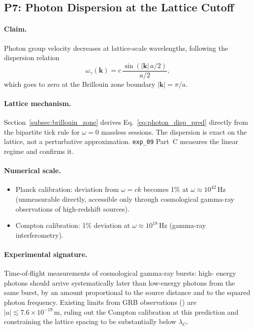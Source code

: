 \subsection{P7: Photon Dispersion at the Lattice Cutoff}
\label{subsec:p7_photon_dispersion}

\paragraph{Claim.}
Photon group velocity decreases at lattice-scale wavelengths,
following the dispersion relation
\begin{equation}
    \omega_\gamma(\mathbf{k})
        = c\,\frac{\sin(|\mathbf{k}|\,a/2)}{a/2},
    \label{eq:photon_disp_pred}
\end{equation}
which goes to zero at the Brillouin zone boundary
$|\mathbf{k}| = \pi/a$.

\paragraph{Lattice mechanism.}
Section~\ref{subsec:brillouin_zone} derives Eq.~\eqref{eq:photon_disp_pred}
directly from the bipartite tick rule for $\omega = 0$ massless
sessions. The dispersion is exact on the lattice, not a perturbative
approximation. \texttt{exp\_09} Part~C measures the linear regime
and confirms it.

\paragraph{Numerical scale.}

\begin{itemize}
    \item Planck calibration: deviation from $\omega = ck$ becomes
    1\% at $\omega \approx 10^{42}\,\text{Hz}$ (unmeasurable directly,
    accessible only through cosmological gamma-ray observations of
    high-redshift sources).
    \item Compton calibration: 1\% deviation at $\omega \approx 10^{18}\,\text{Hz}$
    (gamma-ray interferometry).
\end{itemize}

\paragraph{Experimental signature.}
Time-of-flight measurements of cosmological gamma-ray bursts: high-
energy photons should arrive systematically later than low-energy
photons from the same burst, by an amount proportional to the source
distance and to the squared photon frequency. Existing limits from
GRB observations (\cite{vasileiou2013}) are
$|a| \lesssim 7.6 \times 10^{-19}\,\text{m}$, ruling out the
Compton calibration at this prediction and constraining the lattice
spacing to be substantially below $\lambda_C$.

